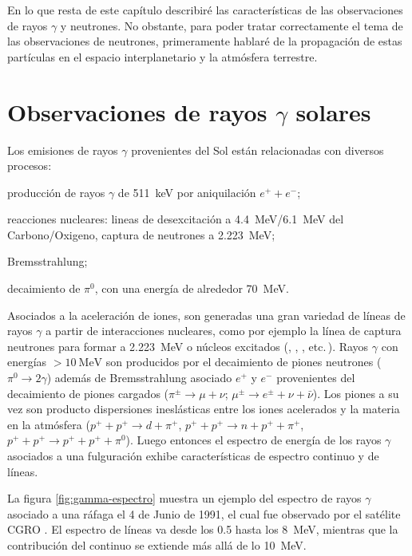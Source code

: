En lo que resta de este capítulo describiré las características de las observaciones de rayos $\gamma$ y neutrones. No obstante, para poder tratar correctamente el tema de las observaciones de neutrones, primeramente hablaré de la propagación de estas partículas en el espacio interplanetario y la atmósfera terrestre.

\section{Observaciones de rayos $\gamma$ solares}

Los emisiones de rayos $\gamma$ provenientes del Sol están relacionadas con diversos procesos:
\begin{enumerate*}
  \item producción de rayos $\gamma$ de \SI{511}{\kilo\electronvolt} por aniquilación $e^{+}+e^{-}$;
  \item reacciones nucleares: lineas de desexcitación a \SI{4.4}{\mega\electronvolt}/\SI{6.1}{\mega\electronvolt} del Carbono/Oxigeno, captura de neutrones a \SI{2.223}{\mega\electronvolt};
  \item Bremsstrahlung;
  \item decaimiento de $\pi^{0}$, con una energía de alrededor \SI{70}{\mega\electronvolt}.
\end{enumerate*}

Asociados a la aceleración de iones, son generadas una gran variedad de líneas de rayos $\gamma$ a partir de interacciones nucleares, como por ejemplo la línea de captura neutrones para formar  a  \SI{2.223}{\mega\electronvolt} o núcleos excitados (, , , etc.\,). Rayos $\gamma$ con energías $>\SI{10}{\mega\electronvolt}$ son producidos por el decaimiento de piones neutrones ($\pi^{0}\rightarrow 2\gamma$) además de Bremsstrahlung asociado $e^{+}$ y $e^{-}$ provenientes del decaimiento de piones cargados ($\pi^{\pm}\rightarrow\mu+\nu$; $\mu^{\pm}\rightarrow e^{\pm}+\nu+\bar{\nu}$). Los piones a su vez son producto dispersiones ineslásticas entre los iones acelerados y la materia en la atmósfera ($p^{+}+p^{+}\rightarrow d+\pi^{+}$, $p^{+}+p^{+}\rightarrow n+p^{+}+\pi^{+}$, $p^{+}+p^{+}\rightarrow p^{+}+p^{+}+\pi^{0}$). Luego entonces el espectro de energía de los rayos $\gamma$ asociados a una fulguración exhibe características de espectro continuo y de líneas.

La figura \ref{fig:gamma-espectro} muestra un ejemplo del espectro de rayos $\gamma$ asociado a una ráfaga el \num{4} de Junio de \num{1991}, el cual fue observado por el satélite CGRO \cite{murphy94}. El espectro de líneas va desde los \num{0.5} hasta los \SI{8}{\mega\electronvolt}, mientras que la contribución del continuo se extiende más allá de lo \SI{10}{\mega\electronvolt}.

